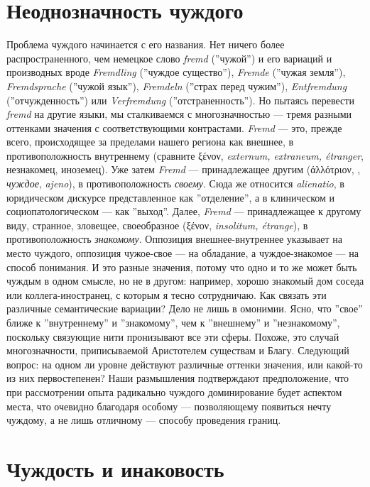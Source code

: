 \documentclass[12pt]{book}
\begin{document}
\section{Неоднозначность чуждого}

Проблема чуждого начинается с его названия. Нет ничего более распространенного, чем немецкое слово \textit{fremd} (''чужой'') и его вариаций и производных вроде \textit{Fremdling} (''чуждое существо''), \textit{Fremde} (''чужая земля''), \textit{Fremdsprache} (''чужой язык''), \textit{Fremdeln} (''страх перед чужим''), \textit{Entfremdung} (''отчужденность'') или \textit{Verfremdung} (''отстраненность''). Но пытаясь перевести \textit{fremd} на другие языки, мы сталкиваемся с многозначностью --- тремя разными оттенками значения с соответствующими контрастами. \textit{Fremd} --- это, прежде всего, происходящее за пределами нашего региона как внешнее, в противоположность внутреннему (сравните ξένον, \textit{externum, extraneum, étranger}, незнакомец, иноземец). Уже затем \textit{Fremd} --- принадлежащее другим (άλλότριον, , \textit{чуждое}, \textit{ajeno}), в противоположность \textit{своему}. Сюда же относится \textit{alienatio}, в юридическом дискурсе представленное как ''отделение'', а в клиническом и социопатологическом --- как ''выход''. Далее, \textit{Fremd} --- принадлежащее к другому виду, странное, зловещее, своеобразное (ξένον, \textit{insolitum, étrange}), в противоположность \textit{знакомому}. Оппозиция внешнее-внутреннее указывает на место чуждого, оппозиция чужое-свое --- на обладание, а чуждое-знакомое --- на способ понимания. И это разные значения, потому что одно и то же может быть чуждым в одном смысле, но не в другом: например, хорошо знакомый дом соседа или коллега-иностранец, с которым я тесно сотрудничаю.
Как связать эти различные семантические вариации? Дело не лишь в омонимии. Ясно, что ''свое'' ближе к ''внутреннему'' и ''знакомому'', чем к ''внешнему'' и ''незнакомому'', поскольку связующие нити пронизывают все эти сферы. Похоже, это случай многозначности, приписываемой Аристотелем существам и Благу. Следующий вопрос: на одном ли уровне действуют различные оттенки значения, или какой-то из них первостепенен? Наши размышления подтверждают предположение, что при рассмотрении опыта радикально чуждого доминирование будет аспектом места, что очевидно благодаря особому --- позволяющему появиться нечту чуждому, а не лишь отличному --- способу проведения границ.

\section{Чуждость и инаковость}
\end{document}

